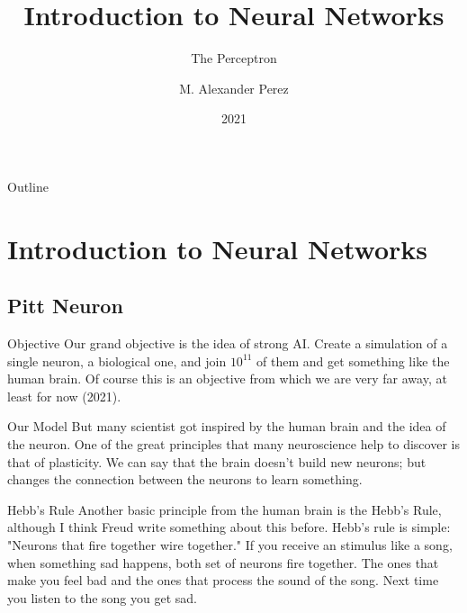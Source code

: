 \documentclass[presentation]{beamer}
\institute{Galileo University -- BiomedLab}
\author{M. Alexander Perez}
\date{2021}
\title{Introduction to Neural Networks}
\subtitle{The Perceptron}
\begin{document}
\maketitle
\begin{frame}{Outline}
\tableofcontents
\end{frame}


\section{Introduction to Neural Networks}
\label{sec:org13d8f24}

\subsection{Pitt Neuron}
\label{sec:org07f478c}

\begin{frame}[label={sec:orgba7fc2e}]{Objective}
Our grand objective is the idea of \alert{strong AI}. Create a simulation of a single neuron, a biological one, and join \(10^{11}\) of them and get something like the human brain. Of course this is an objective from which we are very far away, at least for now (2021).
\end{frame}

\begin{frame}[label={sec:orga106e4c}]{Our Model}
But many scientist got inspired by the human brain and the idea of the neuron. One of the great principles that many neuroscience help to discover is that of plasticity. We can say that the brain doesn't build new neurons; but changes the connection between the neurons to learn something.
\end{frame}

\begin{frame}[label={sec:orge398178}]{Hebb's Rule}
Another basic principle from the human brain is the Hebb's Rule, although I think Freud write something about this before. Hebb's rule is simple: \alert{"Neurons that fire together wire together."} If you receive an stimulus like a song, when something sad happens, both set of neurons fire together. The ones that make you feel bad and the ones that process the sound of the song. Next time you listen to the song you get sad.
\end{frame}
\end{document}
